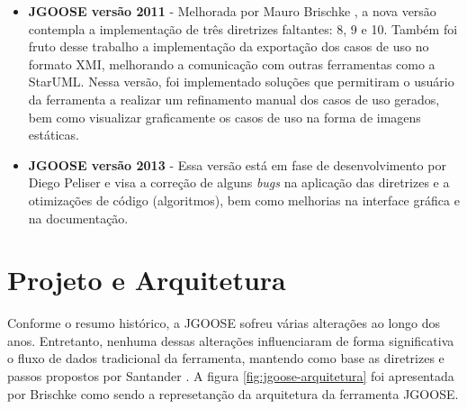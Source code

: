 \begin{itemize}
                \item \textbf{JGOOSE versão 2011} -
                    Melhorada por Mauro Brischke \cite{brischke2011melhorando},
                        a nova versão contempla a implementação de três diretrizes faltantes: 8, 9 e 10.
                    Também foi fruto desse trabalho a implementação da exportação dos casos de uso no formato XMI, melhorando a comunicação com outras ferramentas como a StarUML.
                    Nessa versão, foi implementado soluções que permitiram o usuário da ferramenta a realizar um refinamento manual dos casos de uso gerados, bem como visualizar graficamente os casos de uso na forma de imagens estáticas.

                \item \textbf{JGOOSE versão 2013} - 
                    Essa versão está em fase de desenvolvimento por Diego Peliser \cite{peliser2013aprimorando} e visa a correção de alguns \emph{bugs} na aplicação das diretrizes e a otimizações de código (algoritmos), bem como melhorias na interface gráfica e na documentação.
            \end{itemize}


    \section{Projeto e Arquitetura}
        \label{cap:jgoose-design}
            Conforme o resumo histórico, a JGOOSE sofreu várias alterações ao longo dos anos.
            Entretanto, nenhuma dessas alterações influenciaram de forma significativa o fluxo de dados tradicional da ferramenta, mantendo como base as diretrizes e passos propostos por Santander \cite{santander2002integrando}.
            A figura \ref{fig:jgoose-arquitetura} foi apresentada por Brischke \cite{brischke2011melhorando} como sendo a represetanção da arquitetura da ferramenta JGOOSE.

